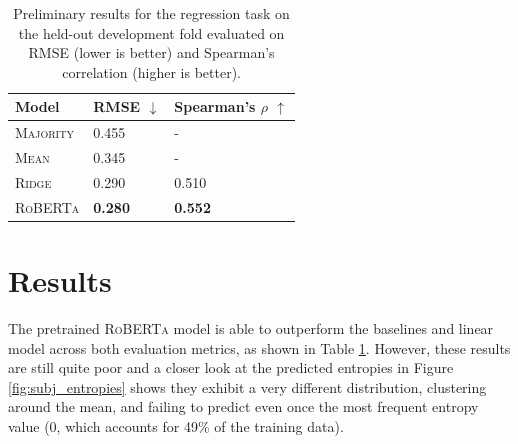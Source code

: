\begin{table}[t]
    \centering
    \small
    \begin{tabular}{lll}
    \toprule
         Model &RMSE $\downarrow$ &Spearman's $\rho$ $\uparrow$ \\
         \midrule
         \textsc{Majority}&0.455 &-\\
         \textsc{Mean} &0.345 &-\\
         \textsc{Ridge} &0.290 &0.510 \\
         \midrule
         \textsc{RoBERTa} &\textbf{0.280} &\textbf{0.552}\\
         \bottomrule
    \end{tabular}
    \caption{Preliminary results for the regression task on the held-out development fold evaluated on RMSE (lower is better) and Spearman's correlation (higher is better).}
    \label{tab:subj_regression_results}
\end{table}



\section{Results}
The pretrained \textsc{RoBERTa} model is able to outperform the baselines and linear model across both evaluation metrics, as shown in Table \ref{tab:subj_regression_results}. However, these results are still quite poor and a closer look at the predicted entropies in Figure \ref{fig:subj_entropies} shows they exhibit a very different distribution, clustering around the mean, and failing to predict even once the most frequent entropy value (0, which accounts for 49\% of the training data).

